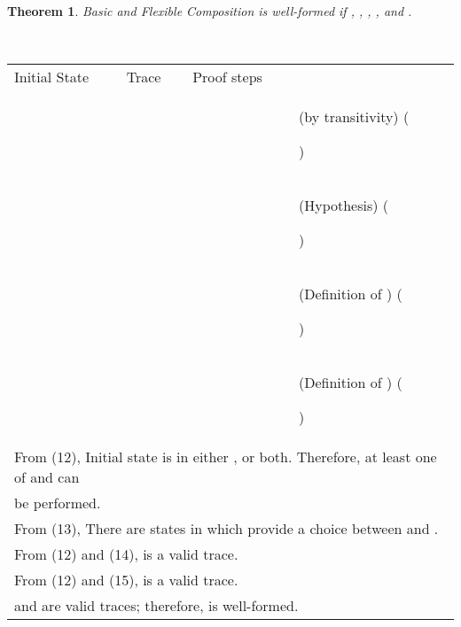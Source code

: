 \documentclass[12pt,journal,letterpaper,onecolumn]{IEEEtran}
\newcounter{myCounter}
\renewcommand{\themyCounter}{\arabic{myCounter}\addtocounter{myCounter}{1}}
\newtheorem{theorem}{Theorem}[section]
\begin{document}
\begin{theorem}
Basic and Flexible Composition  is
well-formed if ,
, ,  , and . \label{theorem:basicflexiblechoice}\end{theorem}
\\
\begin{minipage}{6in} \begin{center}
\begin{tabular}{llp{8cm}p{3.8cm}}
Initial State & Trace &  Proof steps & \\
 &  &   & (by transitivity) \hfill(\themyCounter)\\
 & &   & (Hypothesis) \hfill(\themyCounter)\\
 &  &    & (Definition of ) \hfill(\themyCounter) \\
 &  &    & (Definition of ) \hfill(\themyCounter) \\
\multicolumn{4}{l}{From (12), Initial state  is in either ,  or both. Therefore, at least one of  and  can}\\
\multicolumn{4}{l}{be performed.} \\
\multicolumn{4}{l}{From (13), There are states in  which provide a choice between  and .}\\
\multicolumn{4}{l}{From (12) and (14),  is a valid trace.} \\
\multicolumn{4}{l}{From (12) and (15),  is a valid trace.}\\
\multicolumn{4}{l}{ and  are valid traces; therefore,
 is well-formed.} \hfill
\end{tabular}
\end{center}
\end{minipage}\\
\end{document}
